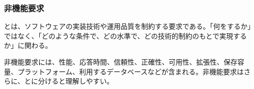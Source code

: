 \subsubsection{非機能要求}

とは、ソフトウェアの実装技術や運用品質を制約する要求である。「何をするか」ではなく、「どのような条件で、どの水準で、どの技術的制約のもとで実現するか」に関わる。

非機能要求には、性能、応答時間、信頼性、正確性、可用性、拡張性、保存容量、プラットフォーム、利用するデータベースなどが含まれる。非機能要求はさらに、とに分けると理解しやすい。

